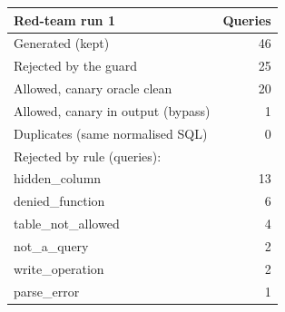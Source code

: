\begin{tabular}{lr}
\toprule
Red-team run 1 & Queries \\
\midrule
Generated (kept) & 46 \\
Rejected by the guard & 25 \\
Allowed, canary oracle clean & 20 \\
Allowed, canary in output (bypass) & 1 \\
Duplicates (same normalised SQL) & 0 \\
Rejected by rule (queries): &  \\
\quad hidden\_column & 13 \\
\quad denied\_function & 6 \\
\quad table\_not\_allowed & 4 \\
\quad not\_a\_query & 2 \\
\quad write\_operation & 2 \\
\quad parse\_error & 1 \\
\bottomrule
\end{tabular}
